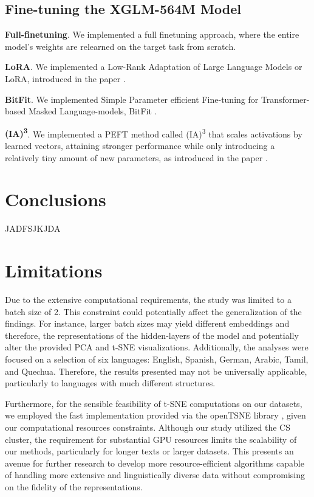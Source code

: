 \documentclass[11pt]{article}
\newcommand{\customsection}[1]{
  \noindent\textbf{#1}.\vspace{2mm}
}
\begin{document}
\subsection{Fine-tuning the XGLM-564M Model}

\customsection{Full-finetuning} We implemented a full finetuning approach, where the entire model's weights are relearned on the target task from scratch.

\customsection{LoRA} We implemented a Low-Rank Adaptation of Large Language Models or LoRA, introduced in the paper \cite{hu2021lora}.

\customsection{BitFit} We implemented Simple Parameter efficient Fine-tuning
for Transformer-based Masked Language-models, BitFit \cite{zaken2022bitfit}.

\customsection{(IA)\textsuperscript{3}} We implemented a PEFT method called (IA)\textsuperscript{3} that scales activations by learned vectors, attaining stronger performance while only introducing a relatively tiny amount of new parameters, as introduced in the paper \cite{liu2022fewshot}.

\section{Conclusions}

JADFSJKJDA

\section*{Limitations}
Due to the extensive computational requirements, the study was limited to a batch size of 2. This constraint could potentially affect the generalization of the findings. For instance, larger batch sizes may yield different embeddings and therefore, the representations of the hidden-layers of the model and potentially alter the provided PCA and t-SNE visualizations. Additionally, the analyses were focused on a selection of six languages: English, Spanish, German, Arabic, Tamil, and Quechua. Therefore, the results presented may not be universally applicable, particularly to languages with much different structures.

Furthermore, for the sensible feasibility of t-SNE computations on our datasets, we employed the fast implementation provided via the openTSNE library \cite{opentsne}, given our computational resources constraints. Although our study utilized the CS cluster, the requirement for substantial GPU resources limits the scalability of our methods, particularly for longer texts or larger datasets. This presents an avenue for further research to develop more resource-efficient algorithms capable of handling more extensive and linguistically diverse data without compromising on the fidelity of the representations.
\end{document}
